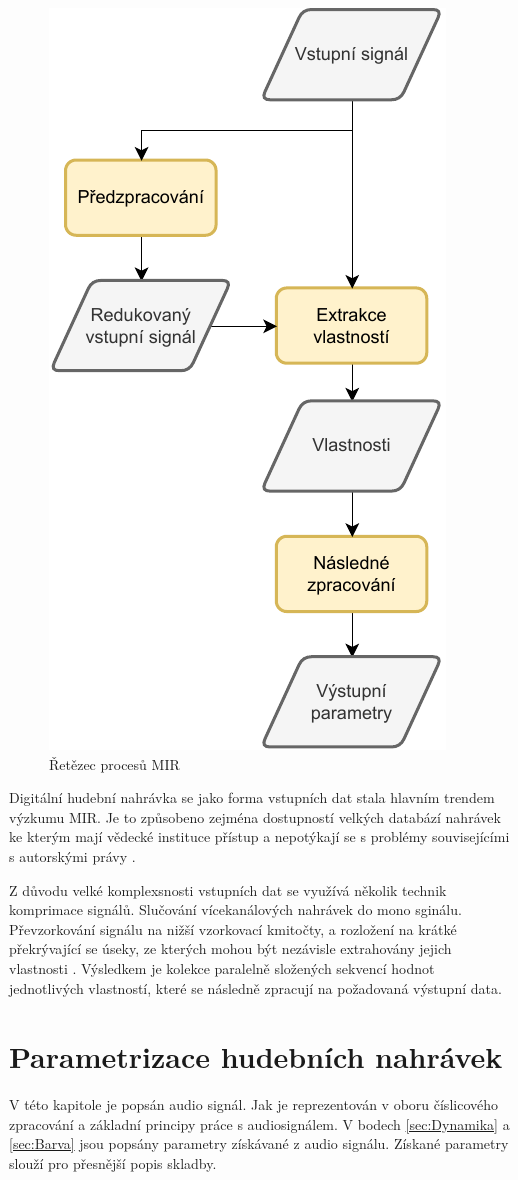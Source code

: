 \begin{figure}[H]
    \centering
    \includegraphics[width = 0.4\linewidth]{obrazky/MIR-diagram.pdf}
    \caption{Řetězec procesů MIR \cite{a_new_companion_to_digital_humanities}}
    \label{fig:MIR_diagram}
\end{figure}

    Digitální hudební nahrávka se jako forma vstupních dat stala hlavním trendem výzkumu \acs{MIR}.
    Je to způsobeno zejména dostupností velkých databází nahrávek ke kterým mají vědecké instituce přístup a nepotýkají se s problémy souvisejícími s autorskými právy \cite{a_new_companion_to_digital_humanities}.

    Z důvodu velké komplexsnosti vstupních dat se využívá několik technik komprimace signálů. 
    Slučování vícekanálových nahrávek do mono sginálu. Převzorkování signálu na nižší vzorkovací kmitočty,
    a rozložení na krátké překrývající se úseky, ze kterých mohou být nezávisle extrahovány jejich vlastnosti \cite{lidy09:448[TUW-181186]}. 
    Výsledkem je kolekce paralelně složených sekvencí hodnot jednotlivých vlastností, které se následně zpracují na požadovaná výstupní data.

  \section{Parametrizace hudebních nahrávek} \label{sec:Parametrizace}
  V této kapitole je popsán audio signál. Jak je reprezentován v oboru číslicového zpracování a základní principy práce s audiosignálem.
  V bodech \ref{sec:Dynamika} a \ref{sec:Barva} jsou popsány parametry získávané z audio signálu.
  Získané parametry slouží pro přesnější popis skladby.

